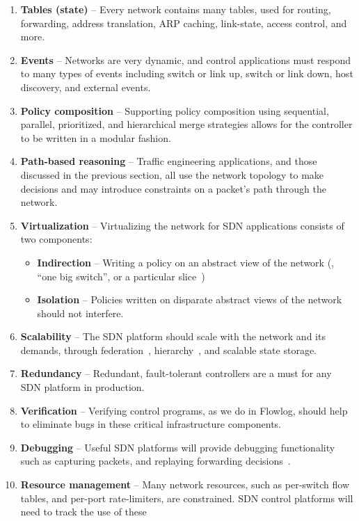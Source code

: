 \begin{enumerate}
\item {\bf Tables (state)} -- Every network contains many tables, used for routing, forwarding,
address translation, ARP caching, link-state, access control, and more.
\item {\bf Events} -- Networks are very dynamic, and control applications must respond to many
types of events including switch or link up, switch or link down, host discovery, and external events.
\item {\bf Policy composition} -- Supporting policy composition using sequential, parallel, prioritized,
and hierarchical merge strategies allows for the controller to be written in a modular fashion.
\item {\bf Path-based reasoning} -- Traffic engineering applications, and those discussed in the
previous section, all use the network topology to make decisions and may introduce constraints
on a packet's path through the network.
\item {\bf Virtualization} -- Virtualizing the network for SDN applications consists of two components:
	\begin{itemize}
	\item {\bf Indirection} -- Writing a policy on an abstract view of the network (\eg, ``one big switch'', or a particular slice~\cite{gutz:hotsdn12-slices})
	\item {\bf Isolation} -- Policies written on disparate abstract views of the network should not interfere.
	\end{itemize}
\item {\bf Scalability} -- The SDN platform should scale with the network and its demands, through
federation~\cite{Tootoonchian:2010}, hierarchy~\cite{kandoo,logical_xbars}, and scalable state storage.
\item {\bf Redundancy} -- Redundant, fault-tolerant controllers are a must for any SDN platform in production.
\item {\bf Verification} -- Verifying control programs, as we do in Flowlog, should help to eliminate
bugs in these critical infrastructure components.
\item {\bf Debugging} -- Useful SDN platforms will provide debugging functionality such as
capturing packets, and replaying forwarding decisions~\cite{packet_history, of_replay}.
\item {\bf Resource management} -- Many network resources, such as per-switch flow tables,
and per-port rate-limiters, are constrained. SDN control platforms will need to track the use of these

\end{enumerate}
